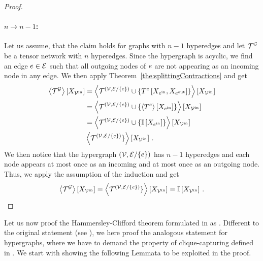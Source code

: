 \begin{proof}
    \paragraph{$n\rightarrow n-1$:} Let us assume, that the claim holds for graphs with $n-1$ hyperedges and let $\mathcal{T}^{\mathcal{G}}$ be a tensor network with $n$ hyperedges.
    Since the hypergraph is acyclic, we find an edge $e\in\mathcal{E}$ such that all outgoing nodes of $e$ are not appearing as an incoming node in any edge.
    We then apply Theorem~\ref{the:splittingContractions} and get
    \begin{align*}
        \left\langle \mathcal{T}^{\mathcal{G}}\right\rangle \left[ X_{\mathcal{V}^{\mathrm{in}}} \right]
        &= \left\langle 
            \mathcal{T}^{(\mathcal{V},\mathcal{E}/\{e\})} \cup \{T^{e}\left[X_{e^{\mathrm{in}}},X_{e^{\mathrm{out}}}\right]\}
        \right\rangle \left[ X_{\mathcal{V}^{\mathrm{in}}} \right] \\
        & = \left\langle 
            \mathcal{T}^{(\mathcal{V},\mathcal{E}/\{e\})} \cup \{\left\langle T^{e}\right\rangle \left[ X_{e^{\mathrm{in}}} \right] \}
        \right\rangle \left[ X_{\mathcal{V}^{\mathrm{in}}} \right] \\
        & = \left\langle 
            \mathcal{T}^{(\mathcal{V},\mathcal{E}/\{e\})} \cup \{\mathbb{I}\left[X_{e^{\mathrm{in}}}\right] \}
        \right\rangle \left[ X_{\mathcal{V}^{\mathrm{in}}} \right] \\
        & \left\langle 
            \mathcal{T}^{(\mathcal{V},\mathcal{E}/\{e\})} \}
        \right\rangle \left[ X_{\mathcal{V}^{\mathrm{in}}} \right] \, .
    \end{align*}
    We then notice that the hypergraph $(\mathcal{V},\mathcal{E}/\{e\})$ has $n-1$ hyperedges and each node appears at most once as an incoming and at most once as an outgoing node.
    Thus, we apply the assumption of the induction and get
    \begin{align*}
        \left\langle \mathcal{T}^{\mathcal{G}}\right\rangle \left[ X_{\mathcal{V}^{\mathrm{in}}} \right] = \left\langle 
            \mathcal{T}^{(\mathcal{V},\mathcal{E}/\{e\})} \}
        \right\rangle \left[ X_{\mathcal{V}^{\mathrm{in}}} \right] = \mathbb{I}\left[X_{\mathcal{V}^{\mathrm{in}}}\right] \, .
    \end{align*}
\end{proof}


\label{sec:proofHCTheorem}

Let us now proof the Hammersley-Clifford theorem formulated in  as .
Different to the original statement (see \cite{hammersley_markov_1971}), we here proof the analogous statement for hypergraphs, where we have to demand the property of clique-capturing defined in .
We start with showing the following Lemmata to be exploited in the proof.

